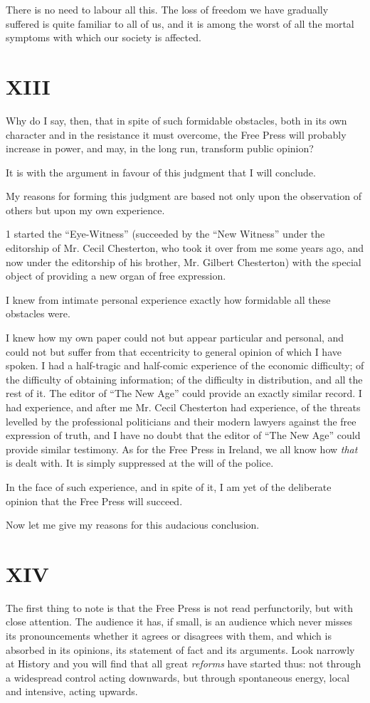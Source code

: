 \documentclass{book}
\begin{document}
There is no need to labour all this. The loss of freedom we have gradually suffered is quite familiar to all of us, and it is among the worst of all the mortal symptoms with which our society is affected.

\chapter*{XIII}
\label{chapter-14}
Why do I say, then, that in spite of such formidable obstacles, both in its own character and in the resistance it must overcome, the Free Press will probably increase in power, and may, in the long run, transform public opinion?

It is with the argument in favour of this judgment that I will conclude.

My reasons for forming this judgment are based not only upon the observation of others but upon my own experience.

1 started the “Eye-Witness” (succeeded by the “New Witness” under the editorship of Mr. Cecil Chesterton, who took it over from me some years ago, and now under the editorship of his brother, Mr. Gilbert Chesterton) with the special object of providing a new organ of free expression.

I knew from intimate personal experience exactly how formidable all these obstacles were.

I knew how my own paper could not but appear particular and personal, and could not but suffer from that eccentricity to general opinion of which I have spoken. I had a half-tragic and half-comic experience of the economic difficulty; of the difficulty of obtaining information; of the difficulty in distribution, and all the rest of it. The editor of “The New Age” could provide an exactly similar record. I had experience, and after me Mr. Cecil Chesterton had experience, of the threats levelled by the professional politicians and their modern lawyers against the free expression of truth, and I have no doubt that the editor of “The New Age” could provide similar testimony. As for the Free Press in Ireland, we all know how \emph{that} is dealt with. It is simply suppressed at the will of the police.

In the face of such experience, and in spite of it, I am yet of the deliberate opinion that the Free Press will succeed.

Now let me give my reasons for this audacious conclusion.

\chapter*{XIV}
\label{chapter-15}
The first thing to note is that the Free Press is not read perfunctorily, but with close attention. The audience it has, if small, is an audience which never misses its pronouncements whether it agrees or disagrees with them, and which is absorbed in its opinions, its statement of fact and its arguments. Look narrowly at History and you will find that all great \emph{reforms} have started thus: not through a widespread control acting downwards, but through spontaneous energy, local and intensive, acting upwards.
\end{document}
